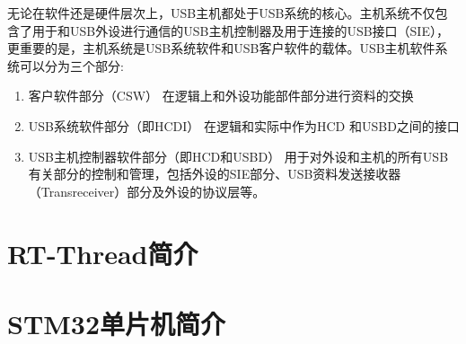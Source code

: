 无论在软件还是硬件层次上，USB主机都处于USB系统的核心。主机系统不仅包含了用于和USB外设进行通信的USB主机控制器及用于连接的USB接口（SIE），更重要的是，主机系统是USB系统软件和USB客户软件的载体。USB主机软件系统可以分为三个部分:      
\begin{enumerate}
\item 客户软件部分（CSW）
在逻辑上和外设功能部件部分进行资料的交换

\item USB系统软件部分（即HCDI）
在逻辑和实际中作为HCD 和USBD之间的接口

\item USB主机控制器软件部分（即HCD和USBD）
用于对外设和主机的所有USB有关部分的控制和管理，包括外设的SIE部分、USB资料发送接收器（Transreceiver）部分及外设的协议层等。
\end{enumerate}


\section{RT-Thread简介}



\section{STM32单片机简介}
















